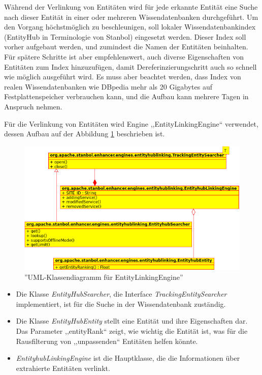 Während der Verlinkung von Entitäten wird für jede erkannte Entität eine Suche nach dieser Entität in einer oder mehreren Wissendatenbanken durchgeführt. Um den Vorgang höchstmöglich zu beschleunigen, soll lokaler Wissendatenbankindex (EntityHub in Terminologie von Stanbol) eingesetzt werden. Dieser Index soll vorher aufgebaut werden, und zumindest die Namen der Entitäten beinhalten. Für spätere Schritte ist aber empfehlenswert, auch diverse Eigenschaften von Entitäten zum Index hinzuzufügen, damit Dereferinzierungschritt auch so schnell wie möglich ausgeführt wird. Es muss aber beachtet werden, dass Index von realen Wissendatenbanken wie DBpedia mehr als 20 Gigabytes auf Festplattenspeicher verbrauchen kann, und die Aufbau kann mehrere Tagen in Anspruch nehmen.

Für die Verlinkung von Entitäten wird Engine ,,EntityLinkingEngine`` verwendet, dessen Aufbau auf der Abbildung \ref{fig:linking} beschrieben ist.

\begin{figure}[ht]
\centering
\includegraphics[width=\textwidth]{Bilder/classes-linking.png}
\caption{''UML-Klassendiagramm für EntityLinkingEngine''}
\label{fig:linking}
\end{figure}
\begin{itemize}
\item Die Klasse \textit{EntityHubSearcher}, die Interface \textit{TrackingEntitySearcher} implementiert, ist für die Suche in der Wissendatenbank zuständig.
\item Die Klasse \textit{EntityHubEntity} stellt eine Entität und ihre Eigenschaften dar. Das Parameter ,,entityRank`` zeigt, wie wichtig die Entität ist, was für die Rausfilterung von ,,unpassenden`` Entitäten helfen könnte.
\item \textit{EntityhubLinkingEngine} ist die Hauptklasse, die die Informationen über extrahierte Entitäten verlinkt.
\end{itemize}

